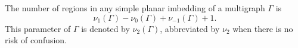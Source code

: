 The number of regions in any simple planar imbedding of a multigraph $\Gamma$ is
$$\nu_1(\Gamma) - \nu_0(\Gamma) + \nu_{-1}(\Gamma) + 1.$$
This parameter of $\Gamma$ is denoted by $\nu_2(\Gamma)$, abbreviated by $\nu_2$ when there is no risk of confusion.
